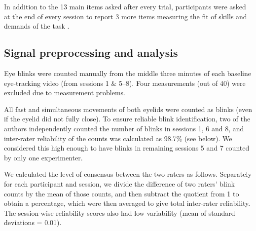 In addition to the 13 main items asked after every trial, participants were asked at the end of every session to report 3 more items measuring the fit of skills and demands of the task \cite{Rheinberg2003}.

%
%

\subsection*{Signal preprocessing and analysis}
Eye blinks were counted manually from the middle three minutes of each baseline eye-tracking video (from sessions 1 \& 5--8). Four measurements (out of 40) were excluded due to measurement problems.

All fast and simultaneous movements of both eyelids were counted as blinks (even if the eyelid did not fully close). To ensure reliable blink identification, two of the authors independently counted the number of blinks in sessions 1, 6 and 8, and inter-rater reliability of the counts was calculated as 98.7\% (see below). We considered this high enough to have blinks in remaining sessions 5 and 7 counted by only one experimenter.

We calculated the level of consensus between the two raters as follows. Separately for each participant and session, we divide the difference of two raters' blink counts by the mean of those counts, and then subtract the quotient from 1 to obtain a percentage, which were then averaged to give total inter-rater reliability. The session-wise reliability scores also had low variability (mean of standard deviations = 0.01).

